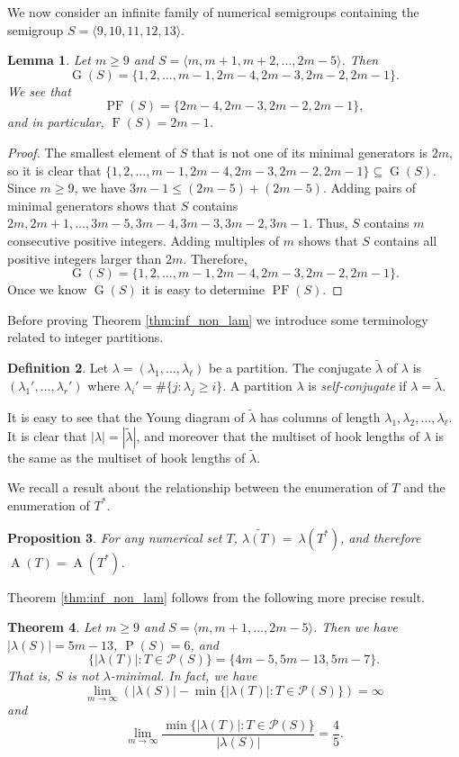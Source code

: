 \documentclass{amsproc}
\DeclareMathOperator{\F}{F}
\DeclareMathOperator{\G}{G}
\DeclareMathOperator{\PF}{PF}
\DeclareMathOperator{\Pa}{P}
\DeclareMathOperator{\A}{A}
\newtheorem{theorem}{Theorem}[section]
\newtheorem{lemma}[theorem]{Lemma}
\newtheorem{prop}[theorem]{Proposition}
\theoremstyle{definition}
\newtheorem{definition}[theorem]{Definition}
\theoremstyle{remark}
\numberwithin{equation}{section}
\begin{document}
We now consider an infinite family of numerical semigroups containing the semigroup $S = \langle 9,10,11,12,13\rangle$.
\begin{lemma}\label{Frob}
    Let $m \ge 9$ and $S=\langle m,m+1,m+2,...,2m-5\rangle$. Then 
    \[
    \G(S)  =   \{1,2,\ldots, m-1, 2m-4,2m-3,2m-2,2m-1\}.
    \]
    \indent We see that
    \[
    \PF(S)  =   \{2m-4,2m-3,2m-2,2m-1\},
    \]
    and in particular, $\F(S) = 2m-1$.
\end{lemma}

\begin{proof}
The smallest element of $S$ that is not one of its minimal generators is $2m$, so it is clear that $\{1,2,\ldots, m-1, 2m-4,2m-3,2m-2,2m-1\} \subseteq \G(S)$.
Since $m\geq 9$, we have $3m-1\leq (2m-5)+(2m-5)$. Adding pairs of minimal generators shows that $S$ contains $2m, 2m+1,\ldots, 3m-5, 3m-4, 3m-3, 3m-2, 3m-1$.  Thus, $S$ contains $m$ consecutive positive integers. Adding multiples of $m$ shows that $S$ contains all positive integers larger than $2m$.  Therefore, 
\[
\G(S) = \{1,2,\ldots, m-1, 2m-4,2m-3,2m-2,2m-1\}.
\] 
Once we know $\G(S)$ it is easy to determine $\PF(S)$.
\end{proof}  

Before proving Theorem \ref{thm:inf_non_lam} we introduce some terminology related to integer partitions.
\begin{definition}
Let $\lambda = (\lambda_1,\ldots, \lambda_\ell)$ be a partition.  The conjugate $\tilde{\lambda}$ of $\lambda$ is $(\lambda_1', \ldots, \lambda_r')$ where $\lambda_i' = \#\{j\colon \lambda_j \ge i\}$. A partition $\lambda$ is \emph{self-conjugate} if $\lambda = \tilde{\lambda}$.
\end{definition}
It is easy to see that the Young diagram of $\tilde{\lambda}$ has columns of length $\lambda_1, \lambda_2,\ldots, \lambda_\ell$.  It is clear that $|\lambda| = |\tilde{\lambda}|$, and moreover that the multiset of hook lengths of $\lambda$ is the same as the multiset of hook lengths of $\tilde{\lambda}$.

We recall a result about the relationship between the enumeration of $T$ and the enumeration of $T^*$.
\begin{prop}\cite[Proposition 12]{CONSTANTIN201799}\label{prop:enum_Tdual}
For any numerical set $T$, $\widetilde{\lambda(T)}=~\lambda(T^*)$, and therefore $\A(T)=\A(T^*)$.
\end{prop}

Theorem \ref{thm:inf_non_lam} follows from the following more precise result.
\begin{theorem}\label{thm:inf_non_lam_sizes}
Let $m \ge 9$ and $S = \langle m, m+1,\ldots, 2m-5\rangle$.  Then we have  $|\lambda(S)| = 5m - 13$, $\Pa(S) = 6$, and 
\[ 
\{|\lambda(T)|: T \in \mathcal{P}(S)\} =
\{4m-5, 5m-13, 5m-7\}.
\]  
That is, $S$ is not $\lambda$-minimal. In fact, we have  
\[
\lim_{m\rightarrow \infty} \left(|\lambda(S)| - \min\{|\lambda(T)| \colon T \in \mathcal{P}(S)\}\right) = \infty
\]
and 
\[
\lim_{m\rightarrow\infty}\frac{\min\{|\lambda(T)|\colon T \in \mathcal{P}(S)\}}{|\lambda(S)|} = \frac{4}{5}.
\]
\end{theorem}
\end{document}
